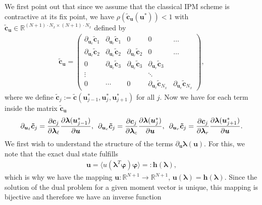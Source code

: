 \documentclass[10pt, a4paper, titlepage, bibliography=totocnumbered]{article}
\newenvironment{proof}[1][Proof]{\begin{trivlist}
\item[\hskip \labelsep {\bfseries #1}]}{\end{trivlist}}
\begin{document}
\begin{proof}
We first point out that since we assume that the classical IPM scheme is contractive at its fix point, we have $\rho (\bm{\tilde c}_{\bm{u}}(\bm{u}^*))<1$ with $\bm{\tilde c}_{\bm{u}}\in\mathbb{R}^{(N+1)\cdot N_x\times (N+1)\cdot N_x}$ defined by
\begin{align*}
\bm{\tilde c}_{\bm{u}} = 
\begin{pmatrix} 
    \partial_{\bm{u}_c}\bm{\tilde c}_{1} & \partial_{\bm{u}_r}\bm{\tilde c}_{1}& 0 & 0 & \dots \\
    \partial_{\bm{u}_{\ell}}\bm{\tilde c}_{2} & \partial_{\bm{u}_c}\bm{\tilde c}_{2} & \partial_{\bm{u}_r}\bm{\tilde c}_{2}& 0 & \dots \\
    0 & \partial_{\bm{u}_{\ell}}\bm{\tilde c}_{3} & \partial_{\bm{u}_c}\bm{\tilde c}_{3} & \partial_{\bm{u}_r}\bm{\tilde c}_{3}\\
    \vdots & & & \ddots & \\
    0 &\cdots &  0 & \partial_{\bm{u}_{\ell}}\bm{\tilde c}_{N_x} & \partial_{\bm{u}_c}\bm{\tilde c}_{N_x}
    \end{pmatrix},
\end{align*}
where we define $\bm{\tilde c}_{j}:=\bm{\tilde c}\left(\bm{u}_{j-1}^*,\bm{u}_{j}^*,\bm{u}_{j+1}^*\right)$ for all $j$. Now we have for each term inside the matrix $\bm{\tilde c}_{\bm{u}}$
\begin{align}\label{eq:cTildeDer}
\partial_{\bm{u}_{\ell}}\bm{\tilde c}_{j} = \frac{\partial \bm{c}_j}{\partial \bm{\lambda}_{\ell}}\frac{\partial \bm{\lambda}(\bm{u}_{j-1}^*)}{\partial \bm{u}},\enskip\partial_{\bm{u}_c}\bm{\tilde c}_{j} = \frac{\partial \bm{c}_j}{\partial \bm{\lambda}_c}\frac{\partial \bm{\lambda}(\bm{u}_j^*)}{\partial \bm{u}},\enskip\partial_{\bm{u}_r}\bm{\tilde c}_{j} = \frac{\partial \bm{c}_j}{\partial \bm{\lambda}_r}\frac{\partial \bm{\lambda}(\bm{u}_{j+1}^*)}{\partial \bm{u}}.
\end{align}
We first wish to understand the structure of the terms $\partial_{\bm{u}} \bm{\lambda}(\bm{u})$. For this, we note that the exact dual state fulfills
\begin{align}\label{eq:ulambda}
\bm{u} = \langle u(\bm{\lambda}^T\bm{\varphi})\bm{\varphi}\rangle =: \bm{h}(\bm{\lambda}),
\end{align}
which is why we have the mapping $\bm{u}:\mathbb{R}^{N+1}\to\mathbb{R}^{N+1}$, $\bm{u}(\bm{\lambda}) = \bm{h}(\bm{\lambda})$. Since the solution of the dual problem for a given moment vector is unique, this mapping is bijective and therefore we have an inverse function

\end{proof}
\end{document}
